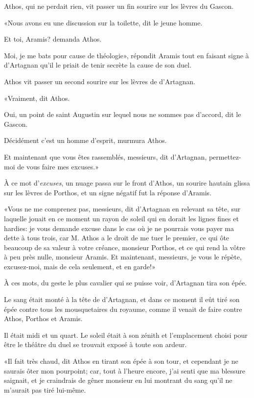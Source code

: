 Athos, qui ne perdait rien, vit passer un fin sourire sur les lèvres du Gascon. 

«Nous avons eu une discussion sur la toilette, dit le jeune homme. 

\speak  Et toi, Aramis? demanda Athos. 

\speak  Moi, je me bats pour cause de théologie», répondit Aramis tout en faisant signe à d'Artagnan qu'il le priait de tenir secrète la cause de son duel. 

Athos vit passer un second sourire sur les lèvres de d'Artagnan. 

«Vraiment, dit Athos. 

\speak  Oui, un point de saint Augustin sur lequel nous ne sommes pas d'accord, dit le Gascon. 

\speak  Décidément c'est un homme d'esprit, murmura Athos. 

\speak  Et maintenant que vous êtes rassemblés, messieurs, dit d'Artagnan, permettez-moi de vous faire mes excuses.» 

À ce mot d'\textit{excuses}, un nuage passa sur le front d'Athos, un sourire hautain glissa sur les lèvres de Porthos, et un signe négatif fut la réponse d'Aramis. 

«Vous ne me comprenez pas, messieurs, dit d'Artagnan en relevant sa tête, sur laquelle jouait en ce moment un rayon de soleil qui en dorait les lignes fines et hardies: je vous demande excuse dans le cas où je ne pourrais vous payer ma dette à tous trois, car M. Athos a le droit de me tuer le premier, ce qui ôte beaucoup de sa valeur à votre créance, monsieur Porthos, et ce qui rend la vôtre à peu près nulle, monsieur Aramis. Et maintenant, messieurs, je vous le répète, excusez-moi, mais de cela seulement, et en garde!» 

À ces mots, du geste le plus cavalier qui se puisse voir, d'Artagnan tira son épée. 

Le sang était monté à la tête de d'Artagnan, et dans ce moment il eût tiré son épée contre tous les mousquetaires du royaume, comme il venait de faire contre Athos, Porthos et Aramis. 

Il était midi et un quart. Le soleil était à son zénith et l'emplacement choisi pour être le théâtre du duel se trouvait exposé à toute son ardeur. 

«Il fait très chaud, dit Athos en tirant son épée à son tour, et cependant je ne saurais ôter mon pourpoint; car, tout à l'heure encore, j'ai senti que ma blessure saignait, et je craindrais de gêner monsieur en lui montrant du sang qu'il ne m'aurait pas tiré lui-même. 

